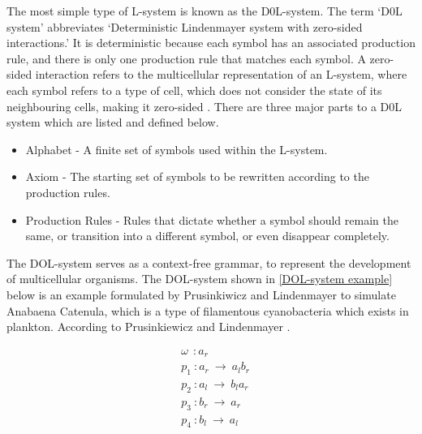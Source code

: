 The most simple type of L-system is known as the D0L-system. The term `D0L system' abbreviates `Deterministic Lindenmayer system with zero-sided interactions.' It is deterministic because each symbol has an associated production rule, and there is only one production rule that matches each symbol. A zero-sided interaction refers to the multicellular representation of an L-system, where each symbol refers to a type of cell, which does not consider the state of its neighbouring cells, making it zero-sided \cite{prusinkiewicz2013lindenmayer}. 
\noindent
There are three major parts to a D0L system which are listed and defined below.


\begin{itemize}[noitemsep]
	\item Alphabet - A finite set of symbols used within the L-system.
	\item Axiom - The starting set of symbols to be rewritten according to the production rules.
	\item Production Rules - Rules that dictate whether a symbol should remain the same, or transition into a different symbol, or even disappear completely.
\end{itemize}
\noindent
The DOL-system serves as a context-free grammar, to represent the development of multicellular organisms. The DOL-system shown in \ref{DOL-system example} below is an example formulated by Prusinkiwicz and Lindenmayer to simulate Anabaena Catenula, which is a type of filamentous cyanobacteria which exists in plankton. According to Prusinkiewicz and Lindenmayer  \cite{prusinkiewicz2012algorithmic}.

\begin{equation} \label{DOL-system example}
\begin{aligned}
	&\omega~~ : a_r \\
	&p_1~ :  a_r~ \rightarrow~ a_l b_r\\
	&p_2~ :  a_l~ \rightarrow~ b_l a_r\\
	&p_3~ :  b_r~ \rightarrow~ a_r\\
	&p_4~ :  b_l~ \rightarrow~ a_l\\
\end{aligned}
\end{equation}

